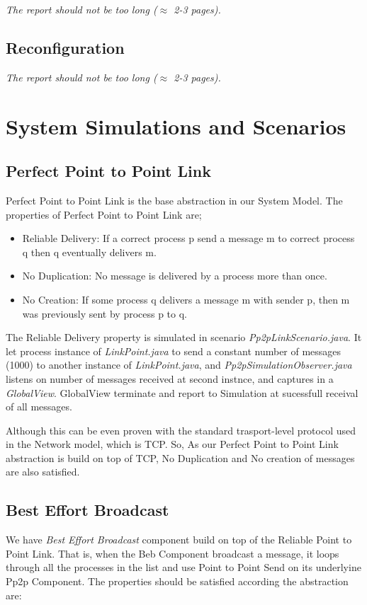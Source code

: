 \documentclass[a4paper, 11pt]{article}
\begin{document}
\textit{The report should not be too long ($\approx$
	2-3 pages).}

\subsection{Reconfiguration}
\textit{The report should not be too long ($\approx$
	2-3 pages).}

\section{System Simulations and Scenarios}

\subsection{Perfect Point to Point Link}
Perfect Point to Point Link is the base abstraction in our System Model. The properties of Perfect Point to Point Link are;
 
\begin{itemize}
	\item Reliable Delivery: If a correct process p send a message m to correct process q then q eventually delivers m.
	
	\item No Duplication: No message is delivered by a process more than once.
	
	\item No Creation: If some process q delivers a message m with sender p, then m was previously sent by process p to q.

\end{itemize}

The Reliable Delivery property is simulated in scenario \textit{Pp2pLinkScenario.java}. It let process instance of \textit{LinkPoint.java} to send a constant number of messages (1000) to another instance of \textit{LinkPoint.java}, and \textit{Pp2pSimulationObserver.java} listens on number of messages received at second instnce, and captures in a 
\textit{GlobalView}. GlobalView terminate and report to Simulation at sucessfull receival of all messages.

Although this can be even proven with the standard trasport-level protocol used in the Network model, which is TCP. 
So, As our Perfect Point to Point Link abstraction is build on top of TCP, No Duplication and No creation of messages are also satisfied.

\subsection{Best Effort Broadcast}
We have \textit{Best Effort Broadcast} component build on top of the 
Reliable Point to Point Link. That is, when the Beb Component broadcast a message, it loops through all the processes in the list and use Point to Point Send on its underlyine Pp2p Component.
The properties should be satisfied according the abstraction are:
\end{document}
